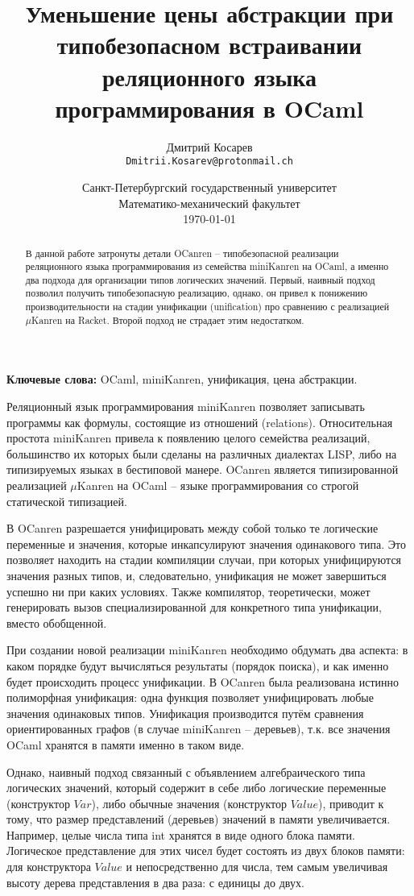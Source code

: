 \documentclass[10pt]{article}
\title{Уменьшение цены абстракции при типобезопасном встраивании реляционного языка программирования в OCaml}
\author{
        Дмитрий Косарев\\ \texttt{Dmitrii.Kosarev@protonmail.ch}
}
\date{
  Санкт-Петербургский государственный университет\\
  Математико-механический факультет\\
  \today
}
\begin{document}
\maketitle

\begin{abstract}
В данной работе затронуты детали OCanren -- типобезопасной реализации реляционного языка программирования
из семейства miniKanren на OCaml, а именно два подхода для организации типов логических значений. Первый,
наивный подход позволил получить типобезопасную реализацию, однако, он привел к понижению производительности
на стадии унификации (unification) про сравнению с реализацией $\mu$Kanren на Racket. Второй подход не 
страдает этим недостатком.

\end{abstract}

\textbf{Ключевые слова:} OCaml, miniKanren, унификация, цена абстракции.

\vspace{5mm}

Реляционный язык программирования miniKanren позволяет записывать программы как формулы, состоящие из отношений
(relations). Относительная простота miniKanren привела к появлению целого семейства реализаций, большинство их 
которых были сделаны на различных диалектах LISP, либо на типизируемых языках в бестиповой манере. OCanren 
является типизированной реализацией $\mu$Kanren на OCaml -- языке программирования со строгой статической 
типизацией.

В OCanren разрешается унифицировать между собой только те логические переменные и значения, которые инкапсулируют
значения одинакового типа. Это позволяет находить на стадии компиляции случаи, при которых унифицируются 
значения разных типов, и, следовательно, унификация не может завершиться успешно ни при каких условиях. Также
компилятор, теоретически, может генерировать вызов специализированной для конкретного типа унификации, вместо 
обобщенной.

При создании новой реализации miniKanren необходимо обдумать два аспекта: в каком порядке будут вычисляться 
результаты (порядок поиска), и как именно будет происходить процесс унификации. В OCanren была реализована истинно 
полиморфная унификация: одна функция позволяет унифицировать любые значения одинаковых типов. Унификация производится
путём сравнения ориентированных графов (в случае miniKanren -- деревьев), т.к. все значения OCaml хранятся в 
памяти именно в таком виде.

Однако, наивный подход связанный с объявлением алгебраического типа логических значений, который содержит в себе 
либо логические переменные (конструктор $Var$), либо обычные значения (конструктор $Value$), приводит к тому, что 
размер представлений (деревьев) значений в памяти увеличивается. 
Например, целые числа типа int хранятся в виде одного блока памяти. Логическое представление для этих чисел
будет состоять из двух блоков памяти: для конструктора $Value$ и непосредственно для числа, тем самым увеличивая 
высоту дерева представления в два раза: с единицы до двух.
\end{document}

